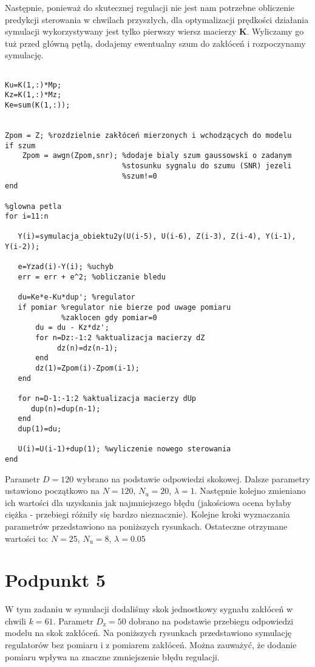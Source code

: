 Następnie, ponieważ do skutecznej regulacji nie jest nam potrzebne obliczenie predykcji sterowania w chwilach przyszłych, dla optymalizacji prędkości działania symulacji wykorzystywany jest tylko pierwszy wiersz macierzy $ \boldsymbol{K} $. Wyliczamy go tuż przed główną pętlą, dodajemy ewentualny szum do zakłóceń i rozpoczynamy symulację.


\begin{lstlisting}[style=Matlab-editor]
%przeksztalcanie wyliczonych macierzy do potrzebnych nam parametrow

Ku=K(1,:)*Mp;
Kz=K(1,:)*Mz;
Ke=sum(K(1,:));


Zpom = Z; %rozdzielnie zakłóceń mierzonych i wchodzących do modelu
if szum
    Zpom = awgn(Zpom,snr); %dodaje bialy szum gaussowski o zadanym
                           %stosunku sygnalu do szumu (SNR) jezeli 
                           %szum!=0
end

%glowna petla
for i=11:n

   Y(i)=symulacja_obiektu2y(U(i-5), U(i-6), Z(i-3), Z(i-4), Y(i-1), Y(i-2));

   e=Yzad(i)-Y(i); %uchyb
   err = err + e^2; %obliczanie bledu

   du=Ke*e-Ku*dup'; %regulator
   if pomiar %regulator nie bierze pod uwage pomiaru 
   			 %zaklocen gdy pomiar=0
       du = du - Kz*dz';
       for n=Dz:-1:2 %aktualizacja macierzy dZ
       		dz(n)=dz(n-1);
       end
       dz(1)=Zpom(i)-Zpom(i-1);
   end

   for n=D-1:-1:2 %aktualizacja macierzy dUp
      dup(n)=dup(n-1);
   end
   dup(1)=du;
   
   U(i)=U(i-1)+dup(1); %wyliczenie nowego sterowania
end
\end{lstlisting}

Parametr $ D = \num{120} $ wybrano na podstawie odpowiedzi skokowej. Dalsze parametry ustawiono początkowo na $ N = \num{120} $, $ N_\mathrm{u} = \num{20} $, $ \lambda = \num{1} $. Następnie kolejno zmieniano ich wartości dla uzyskania jak najmniejszego błędu (jakościowa ocena byłaby ciężka - przebiegi różniły się bardzo nieznacznie). Kolejne kroki wyznaczania parametrów przedstawiono na poniższych rysunkach. Ostateczne otrzymane wartości to: $ N = \num{25} $, $ N_\mathrm{u} = \num{8} $, $ \lambda = \num{0,05} $


\chapter{Podpunkt 5}
W tym zadaniu w symulacji dodaliśmy skok jednostkowy sygnału zakłóceń w chwili $ k = 61 $. Parametr $ D_\mathrm{z} = 50 $ dobrano na podstawie przebiegu odpowiedzi modelu na skok zakłóceń. Na poniższych rysunkach przedstawiono symulację regulatorów bez pomiaru i z pomiarem zakłóceń. Można zauważyć, że dodanie pomiaru wpływa na znaczne zmniejszenie błędu regulacji.



